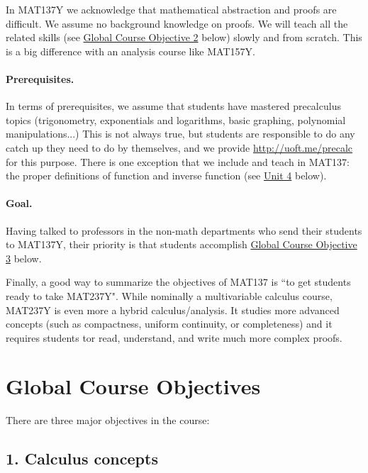 \documentclass[11pt]{article}
\begin{document}
	In MAT137Y we acknowledge that mathematical abstraction and proofs are difficult. We assume no background knowledge on proofs. We will teach all the related skills (see \hyperref[CO2]{Global Course Objective 2} below) slowly and from scratch. This is a big difference with an analysis course like MAT157Y.

	\paragraph{Prerequisites.}
	In terms of prerequisites, we assume that students have mastered precalculus
	topics (trigonometry, exponentials and logarithms, basic graphing, polynomial
	manipulations...) This is not always true, but students are responsible to do any
	catch up they need to do by themselves, and we provide
	\href{http://uoft.me/precalc}{http://uoft.me/precalc} for this purpose. There is
	one exception that we include and teach in MAT137: the proper definitions of
	function and inverse function (see \hyperref[unit4]{Unit 4} below).

	\paragraph{Goal.}
	Having talked to professors in the non-math departments who send their students
	to MAT137Y, their priority is that students accomplish
	\hyperref[CO3]{Global Course Objective 3} below.

	Finally, a good way to summarize the objectives of MAT137 is ``to get students ready to take MAT237Y". While nominally a multivariable calculus course, MAT237Y is even more a hybrid calculus/analysis. It studies more advanced concepts (such as compactness, uniform continuity, or completeness) and it requires students tor read, understand, and write much more complex proofs. 
	\newpage

	\section{Global Course Objectives}


	There are three major objectives in the course:

	\subsection{1. Calculus concepts}
\end{document}
